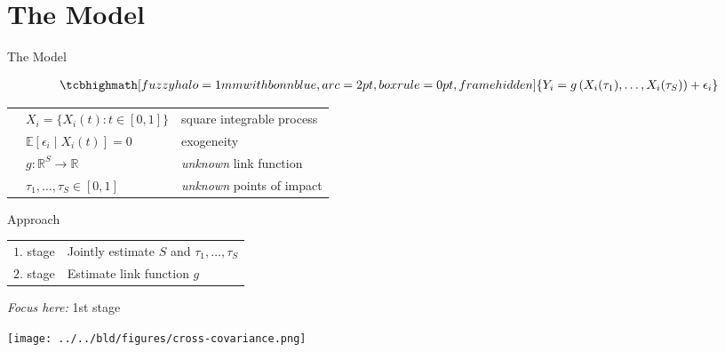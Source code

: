 \section{The Model}


\begin{frame}{The Model}

    \vspace{-1cm}
    \begin{align*}
        \tcbhighmath[fuzzy halo=1mm with bonnblue,arc=2pt, boxrule=0pt,frame
        hidden]{
            Y_i = g\left(X_i(\tau_1), \dots, X_i(\tau_S) \right) +  \epsilon_i
        }
    \end{align*}

    \vspace{0.5cm}
    \begin{table}[]
    \renewcommand{\arraystretch}{1.5}
        \begin{tabular}{ll}
           $\quad X_i = \{ X_i(t) : t \in [0, 1]\}$ & square integrable process\\
           $\quad \mathbb{E}\left[\epsilon_i \mid X_i(t) \right] = 0$ &  exogeneity\\
           $\quad g : \mathbb{R}^S \to \mathbb{R}$ & \emph{unknown} link function \\
           $\quad \tau_1, \dots, \tau_S \in [0, 1]$ &  \emph{unknown} points of impact
        \end{tabular}
    \end{table}

\end{frame}


\begin{frame}{Approach}

    \begin{table}[]
    \renewcommand{\arraystretch}{1.5}
        \begin{tabular}{ll}

            \textcolor{bonnblue}{$1$. stage} & Jointly estimate $S$ and $\tau_1, \dots,
            \tau_S$\\
            \textcolor{bonnblue}{$2$. stage} & Estimate link function $g$

        \end{tabular}
    \end{table}


    \vspace{1cm}
    \emph{Focus here:} 1st stage

\end{frame}


\begin{frame}

    \begin{center}
        \texttt{[image: ../../bld/figures/cross-covariance.png]}
    \end{center}


\end{frame}
